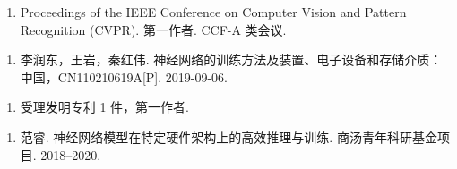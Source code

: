 \documentclass[
  fontset = source,
]{shtthesis}
\begin{document}
\begin{publications*}
\begin{enumerate}
  \item Proceedings of the IEEE Conference on Computer Vision and Pattern Recognition (CVPR). 第一作者. CCF-A 类会议.
\end{enumerate}
\end{publications*}

\begin{patterns}
\begin{enumerate}
  \item 李润东，王岩，秦红伟. 神经网络的训练方法及装置、电子设备和存储介质：中国，CN110210619A[P]. 2019-09-06.
\end{enumerate}
\end{patterns}

\begin{patterns*}
\begin{enumerate}
  \item 受理发明专利 1 件，第一作者.
\end{enumerate}
\end{patterns*}

\begin{projects}
\begin{enumerate}
  \item 范睿. 神经网络模型在特定硬件架构上的高效推理与训练. 商汤青年科研基金项目. 2018--2020.
\end{enumerate}
\end{projects}
\end{document}

